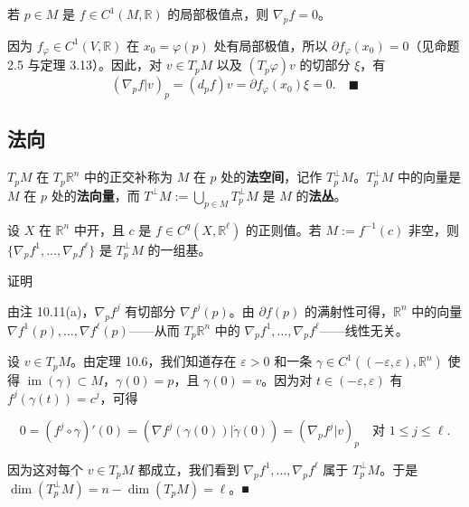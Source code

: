 \begin{theorem}

若 $ p \in M $ 是 $ f \in C^{1}(M,\mathbb{R}) $ 的局部极值点，则 $ \nabla_{p}f = 0 $。

\proofhead
因为 $ f_{\varphi} \in C^{1}(V,\mathbb{R}) $ 在 $ x_{0} = \varphi(p) $ 处有局部极值，所以 $ \partial f_{\varphi}(x_{0}) = 0 $（见命题 2.5 与定理 3.13）。因此，对 $ v \in T_{p}M $ 以及 $ (T_{p}\varphi)v $ 的切部分 $ \xi $，有
\[
(\nabla_{p}f|v)_{p} = (d_{p}f)v = \partial f_{\varphi}(x_{0})\xi = 0 .\quad\blacksquare
\]
\end{theorem}

\subsection*{法向}

$ T_{p}M $ 在 $ T_{p}\mathbb{R}^{n} $ 中的正交补称为 $ M $ 在 $ p $ 处的\textbf{法空间}，记作 $ T_{p}^{\perp}M $。$ T_{p}^{\perp}M $ 中的向量是 $ M $ 在 $ p $ 处的\textbf{法向量}，而 $ T^{\perp}M := \bigcup_{p\in M}T_{p}^{\perp}M $ 是 $ M $ 的\textbf{法丛}。

\begin{proposition}

设 $ X $ 在 $ \mathbb{R}^{n} $ 中开，且 $ c $ 是 $ f \in C^{q}(X,\mathbb{R}^{\ell}) $ 的正则值。若 $ M := f^{-1}(c) $ 非空，则 $ \{\nabla_{p}f^{1}, \ldots, \nabla_{p}f^{\ell}\} $ 是 $ T_{p}^{\perp}M $ 的一组基。

证明

\begin{subitems}
\item

由注 10.11(a)，$ \nabla_{p}f^{j} $ 有切部分 $ \nabla f^{j}(p) $。由 $ \partial f(p) $ 的满射性可得，$ \mathbb{R}^{n} $ 中的向量 $ \nabla f^{1}(p), \ldots, \nabla f^{\ell}(p) $——从而 $ T_{p}\mathbb{R}^{n} $ 中的 $ \nabla_{p}f^{1}, \ldots, \nabla_{p}f^{\ell} $——线性无关。

\item

设 $ v \in T_{p}M $。由定理 10.6，我们知道存在 $ \varepsilon > 0 $ 和一条 $ \gamma \in C^{1}\left((-\varepsilon,\varepsilon),\mathbb{R}^{n}\right) $ 使得 $ \operatorname{im}(\gamma) \subset M $，$ \gamma(0) = p $，且 $ \gamma(0) = v $。因为对 $ t \in (-\varepsilon,\varepsilon) $ 有 $ f^{j}\left(\gamma(t)\right) = c^{j} $，可得

\[
0 = (f^{j}\circ\gamma)'(0) = \left(\nabla f^{j}(\gamma(0))\big|\dot{\gamma}(0)\right) = (\nabla_{p}f^{j}|v)_{p} \quad \text{对 } 1 \le j \le \ell .
\]

因为这对每个 $ v \in T_{p}M $ 都成立，我们看到 $ \nabla_{p}f^{1}, \ldots, \nabla_{p}f^{\ell} $ 属于 $ T_{p}^{\perp}M $。于是 $ \dim(T_{p}^{\perp}M) = n - \dim(T_{p}M) = \ell $。\nobreak\hspace{0.35em}■

\end{subitems}

\end{proposition}

